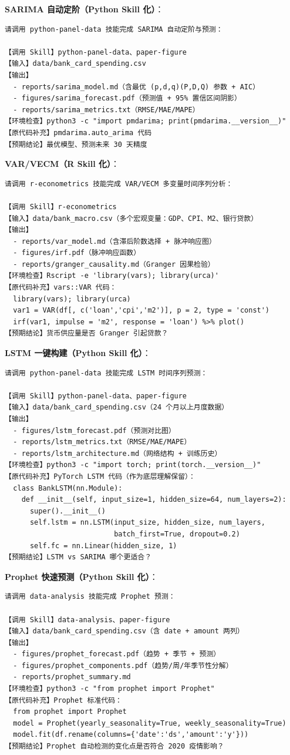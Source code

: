 \textbf{SARIMA 自动定阶（Python Skill 化）}：
\begin{lstlisting}
请调用 python-panel-data 技能完成 SARIMA 自动定阶与预测：

【调用 Skill】python-panel-data、paper-figure
【输入】data/bank_card_spending.csv
【输出】
  - reports/sarima_model.md（含最优 (p,d,q)(P,D,Q) 参数 + AIC）
  - figures/sarima_forecast.pdf（预测值 + 95% 置信区间阴影）
  - reports/sarima_metrics.txt（RMSE/MAE/MAPE）
【环境检查】python3 -c "import pmdarima; print(pmdarima.__version__)"
【原代码补充】pmdarima.auto_arima 代码
【预期结论】最优模型、预测未来 30 天精度
\end{lstlisting}

\textbf{VAR/VECM（R Skill 化）}：
\begin{lstlisting}
请调用 r-econometrics 技能完成 VAR/VECM 多变量时间序列分析：

【调用 Skill】r-econometrics
【输入】data/bank_macro.csv（多个宏观变量：GDP、CPI、M2、银行贷款）
【输出】
  - reports/var_model.md（含滞后阶数选择 + 脉冲响应图）
  - figures/irf.pdf（脉冲响应函数）
  - reports/granger_causality.md（Granger 因果检验）
【环境检查】Rscript -e 'library(vars); library(urca)'
【原代码补充】vars::VAR 代码：
  library(vars); library(urca)
  var1 = VAR(df[, c('loan','cpi','m2')], p = 2, type = 'const')
  irf(var1, impulse = 'm2', response = 'loan') %>% plot()
【预期结论】货币供应量是否 Granger 引起贷款？
\end{lstlisting}

\textbf{LSTM 一键构建（Python Skill 化）}：
\begin{lstlisting}
请调用 python-panel-data 技能完成 LSTM 时间序列预测：

【调用 Skill】python-panel-data、paper-figure
【输入】data/bank_card_spending.csv（24 个月以上月度数据）
【输出】
  - figures/lstm_forecast.pdf（预测对比图）
  - reports/lstm_metrics.txt（RMSE/MAE/MAPE）
  - reports/lstm_architecture.md（网络结构 + 训练历史）
【环境检查】python3 -c "import torch; print(torch.__version__)"
【原代码补充】PyTorch LSTM 代码（作为底层理解保留）：
  class BankLSTM(nn.Module):
    def __init__(self, input_size=1, hidden_size=64, num_layers=2):
      super().__init__()
      self.lstm = nn.LSTM(input_size, hidden_size, num_layers,
                          batch_first=True, dropout=0.2)
      self.fc = nn.Linear(hidden_size, 1)
【预期结论】LSTM vs SARIMA 哪个更适合？
\end{lstlisting}

\textbf{Prophet 快速预测（Python Skill 化）}：
\begin{lstlisting}
请调用 data-analysis 技能完成 Prophet 预测：

【调用 Skill】data-analysis、paper-figure
【输入】data/bank_card_spending.csv（含 date + amount 两列）
【输出】
  - figures/prophet_forecast.pdf（趋势 + 季节 + 预测）
  - figures/prophet_components.pdf（趋势/周/年季节性分解）
  - reports/prophet_summary.md
【环境检查】python3 -c "from prophet import Prophet"
【原代码补充】Prophet 标准代码：
  from prophet import Prophet
  model = Prophet(yearly_seasonality=True, weekly_seasonality=True)
  model.fit(df.rename(columns={'date':'ds','amount':'y'}))
【预期结论】Prophet 自动检测的变化点是否符合 2020 疫情影响？
\end{lstlisting}

